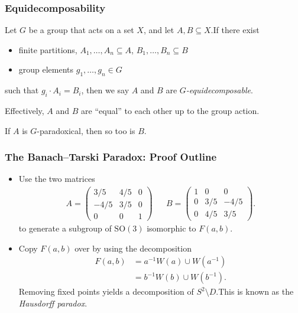 \documentclass{beamer-custom}
\begin{document}
\begin{frame}
  \frametitle{Equidecomposability}
  Let $G$ be a group that acts on a set $X$, and let $A,B\subseteq X$.\pause\:If there exist
  \begin{itemize}
    \item finite partitions, $A_1,\dots,A_n\subseteq A$, $B_1,\dots,B_n\subseteq B$
    \item group elements $g_1,\dots,g_n\in G$
  \end{itemize}
  such that $g_i\cdot A_i = B_i$, then we say $A$ and $B$ are \textit{$G$-equidecomposable}.\pause\newline

  Effectively, $A$ and $B$ are ``equal'' to each other up to the group action.\pause\newline

  If $A$ is $G$-paradoxical, then so too is $B$.
\end{frame}
\begin{frame}
  \frametitle{The Banach--Tarski Paradox: Proof Outline}
  \small
  \begin{itemize}
    \item Use the two matrices
      \begin{align*}
        A = \begin{pmatrix}3/5 & 4/5 & 0 \\  -4/5 & 3/5 & 0 \\ 0 & 0 & 1\end{pmatrix}
                               && B = \begin{pmatrix}1 & 0 & 0 \\ 0 & 3/5 & -4/5 \\ 0 & 4/5 & 3/5\end{pmatrix}.
      \end{align*}
      to generate a subgroup of $\text{SO}\left( 3 \right)$ isomorphic to $F(a,b)$.\pause
    \item Copy $F(a,b)$ over by using the decomposition
      \begin{align*}
        F(a,b) &= a^{-1}W\left( a \right)\cup W\left( a^{-1} \right)\\
                &= b^{-1}W\left( b \right) \cup W\left( b^{-1} \right).
      \end{align*}\pause
      Removing fixed points yields a decomposition of $S^{2}\setminus D$.\:This is known as the \textit{Hausdorff paradox}.
  \end{itemize}
\end{frame}
\end{document}
